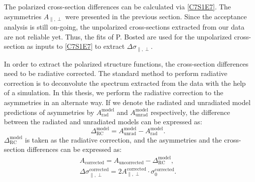 The polarized cross-section differences can be calculated via \cref{C7S1E7}. The asymmetries $A_{\parallel,\perp}$ were presented in the previous section. Since the acceptance analysis is still on-going, the unpolarized cross-sections extracted from our data are not reliable yet. Thus, the fits of P. Bosted \cite{Bosted2008} are used for the unpolarized cross-section as inputs to \cref{C7S1E7} to extract $\Delta\sigma_{\parallel,\perp}$.

In order to extract the polarized structure functions, the cross-section differences need to be radiative corrected. The standard method to perform radiative correction is to deconvolute the spectrum extracted from the data with the help of a simulation. In this thesis, we perform the radiative correction to the asymmetries in an alternate way. If we denote the radiated and unradiated model predictions of asymmetries by $A_{\mathrm{rad}}^{\mathrm{model}}$ and $A_{\mathrm{unrad}}^{\mathrm{model}}$ respectively, the difference between the radiated and unradiated models can be expressed as:
\begin{equation} \label{C8S3E1}
\Delta_{\mathrm{RC}}^{\mathrm{model}} = A_{\mathrm{unrad}}^{\mathrm{model}}-A_{\mathrm{rad}}^{\mathrm{model}}.
\end{equation}
$\Delta_{\mathrm{RC}}^{\mathrm{model}}$ is taken as the radiative correction, and the asymmetries and the cross-section differences can be expressed as:
\begin{gather} \label{C8S3E2}
A_{\mathrm{corrected}} = A_{\mathrm{uncorrected}}-\Delta_{\mathrm{RC}}^{\mathrm{model}}, \\ \label{C8S3E3}
\Delta\sigma_{\parallel,\perp}^{\mathrm{corrected}} = 2A_{\parallel,\perp}^{\mathrm{corrected}} \cdot \sigma_0^{\mathrm{corrected}}.
\end{gather}

